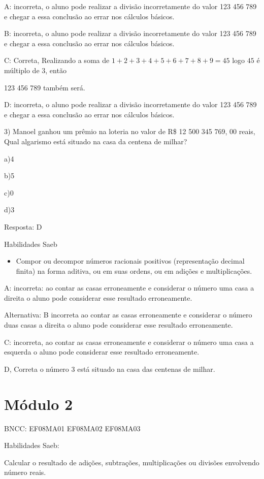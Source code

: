 A: incorreta, o aluno pode realizar a divisão incorretamente do valor
123 456 789 e chegar a essa conclusão ao errar nos cálculos básicos.

B: incorreta, o aluno pode realizar a divisão incorretamente do valor
123 456 789 e chegar a essa conclusão ao errar nos cálculos básicos.

C: Correta, Realizando a soma de $1+2+3+4+5+6+7+8+9=45$ logo $45$ é
múltiplo de 3, então

123 456 789 também será.

D: incorreta, o aluno pode realizar a divisão incorretamente do valor
123 456 789 e chegar a essa conclusão ao errar nos cálculos básicos.

3) Manoel ganhou um prêmio na loteria no valor de R\$ 12 500 345 769, 00
reais, Qual algarismo está situado na casa da centena de milhar?

a)4

b)5

c)0

d)3

Resposta: D

Habilidades Saeb

\begin{itemize}
\tightlist
\item
  Compor ou decompor números racionais positivos (representação decimal
  finita) na forma aditiva, ou em suas ordens, ou em adições e
  multiplicações.
\end{itemize}

A: incorreta: ao contar as casas erroneamente e considerar o número uma
casa a direita o aluno pode considerar esse resultado erroneamente.

Alternativa: B incorreta ao contar as casas erroneamente e considerar o
número duas casas a direita o aluno pode considerar esse resultado
erroneamente.

C: incorreta, ao contar as casas erroneamente e considerar o número uma
casa a esquerda o aluno pode considerar esse resultado erroneamente.

D, Correta o número 3 está situado na casa das centenas de milhar.

\section{Módulo 2}

BNCC: EF08MA01 EF08MA02 EF08MA03

Habilidades Saeb:

Calcular o resultado de adições, subtrações, multiplicações ou divisões
envolvendo número reais.

